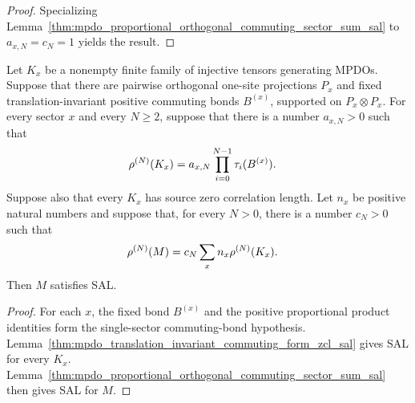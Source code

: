 \begin{proof}\leanok
    Specializing
    Lemma~\ref{thm:mpdo_proportional_orthogonal_commuting_sector_sum_sal}
    to $a_{x,N}=c_N=1$ yields the result.
\end{proof}

\begin{lemma}
    \label{thm:mpdo_proportional_orthogonal_commuting_sector_zcl_sal}
    \leanok
    Let $K_x$ be a nonempty finite family of injective tensors generating
    MPDOs. Suppose that there are pairwise orthogonal one-site
    projections $P_x$ and fixed translation-invariant positive commuting
    bonds $B^{(x)}$, supported on $P_x\otimes P_x$. For every sector $x$ and
    every $N\geq2$, suppose that there is a number $a_{x,N}>0$ such that
    \begin{align}
        \rho^{(N)}(K_x)
         & =a_{x,N}\prod_{i=0}^{N-1}\tau_i(B^{(x)}).
        \notag
    \end{align}
    Suppose also that every $K_x$ has source zero correlation length. Let
    $n_x$ be positive natural numbers and suppose that, for every $N>0$,
    there is a number $c_N>0$ such that
    \begin{align}
        \rho^{(N)}(M)
         & =c_N\sum_x n_x\rho^{(N)}(K_x).
        \notag
    \end{align}
    Then $M$ satisfies SAL.

\end{lemma}

\begin{proof}\leanok
    For each $x$, the fixed bond $B^{(x)}$ and the positive proportional
    product identities form the single-sector commuting-bond hypothesis.
    Lemma~\ref{thm:mpdo_translation_invariant_commuting_form_zcl_sal}
    gives SAL for every $K_x$.
    Lemma~\ref{thm:mpdo_proportional_orthogonal_commuting_sector_sum_sal}
    then gives SAL for $M$.
\end{proof}

